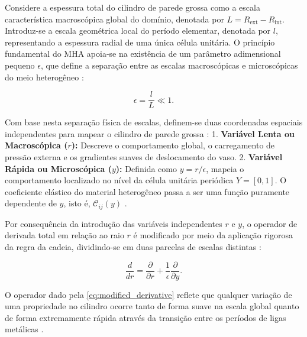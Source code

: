 Considere a espessura total do cilindro de parede grossa como a escala característica macroscópica global do domínio, denotada por $L = R_{\text{ext}} - R_{\text{int}}$. Introduz-se a escala geométrica local do período elementar, denotada por $l$, representando a espessura radial de uma única célula unitária. O princípio fundamental do MHA apoia-se na existência de um parâmetro adimensional pequeno $\epsilon$, que define a separação entre as escalas macroscópicas e microscópicas do meio heterogêneo \cite{bakhvalov1989}:


\begin{equation}
  \epsilon = \frac{l}{L} \ll 1.
  \label{eq:epsilon_scale}
\end{equation}


Com base nesta separação física de escalas, definem-se duas coordenadas espaciais independentes para mapear o cilindro de parede grossa \cite{bakhvalov1989}:
1. \textbf{Variável Lenta ou Macroscópica ($r$):} Descreve o comportamento global, o carregamento de pressão externa e os gradientes suaves de deslocamento do vaso.
2. \textbf{Variável Rápida ou Microscópica ($y$):} Definida como $y = r/\epsilon$, mapeia o comportamento localizado no nível da célula unitária periódica $Y = [0, 1]$. O coeficiente elástico do material heterogêneo passa a ser uma função puramente dependente de $y$, isto é, $\mathcal{C}_{ij}(y)$ \cite{bakhvalov1989}.

Por consequência da introdução das variáveis independentes $r$ e $y$, o operador de derivada total em relação ao raio $r$ é modificado por meio da aplicação rigorosa da regra da cadeia, dividindo-se em duas parcelas de escalas distintas \cite{bakhvalov1989}:

\begin{equation}
  \frac{d}{d r} = \frac{\partial}{\partial r} + \frac{1}{\epsilon} \frac{\partial}{\partial y}.
  \label{eq:modified_derivative}
\end{equation}

O operador dado pela \eqref{eq:modified_derivative} reflete que qualquer variação de uma propriedade no cilindro ocorre tanto de forma suave na escala global quanto de forma extremamente rápida através da transição entre os períodos de ligas metálicas \cite{bakhvalov1989}.

